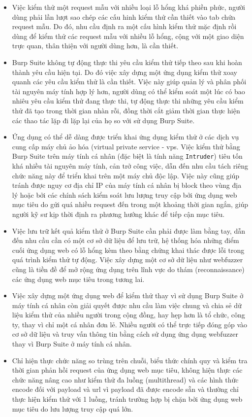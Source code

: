 \begin{itemize}
    \item Việc kiểm thử một request mẫu với nhiều loại lỗ hổng khá phiền phức, người dùng phải lần lượt sao chép các cấu hinh kiểm thử cần thiết vào tab chứa request mẫu. Do đó, nhu cầu định ra một cấu hình kiểm thử mặc định rồi dùng để kiểm thử các request mẫu với nhiều lỗ hổng, cộng với một giao diện trực quan, thân thiện với người dùng hơn, là cần thiết.
    \item Burp Suite không tự động thực thi yêu cầu kiểm thử tiếp theo sau khi hoàn thành yêu cầu hiện tại. Do đó việc xây dựng một ứng dụng kiểm thử xoay quanh các yêu cầu kiểm thử là cần thiết. Việc này giúp quản lý và phân phối tài nguyên máy tính hợp lý hơn, người dùng có thể kiểm soát một lúc có bao nhiêu yêu cầu kiểm thử đang thực thi, tự động thực thi những yêu cầu kiểm thử đã tạo trong thời gian nhàn rỗi, đồng thời cắt giảm thời gian thực hiện các thao tác lặp đi lặp lại của họ so với sử dụng Burp Suite.
    \item Ứng dụng có thể dễ dàng được triển khai ứng dụng kiểm thử ở các dịch vụ cung cấp máy chủ ảo hóa (virtual private service - \acrshort{vps}. Việc kiểm thử bằng Burp Suite trên máy tính cá nhân (đặc biệt là tính năng \texttt{Intruder}) tiêu tốn khá nhiều tài nguyên máy tính, cản trở công việc, dẫn đến nhu cầu tách riêng chức năng này để triển khai trên một máy chủ độc lập. Việc này cũng giúp tránh được nguy cơ địa chỉ IP của máy tính cá nhân bị block theo vùng địa lý hoặc bởi các chính sách kiểm soát lưu lượng truy cập bởi ứng dụng web mục tiêu do gửi quá nhiều request đến trong một khoảng thời gian ngắn, giúp người kỹ sư kịp thời định ra phương hướng khác để tiếp cận mục tiêu.
    \item Việc lưu trữ kết quả kiểm thử ở Burp Suite cần phải được làm bằng tay, dẫn đến nhu cầu cần có một cơ sở dữ liệu để lưu trữ, hệ thống hóa những điểm cuối ứng dụng web có lỗ hổng kèm theo bằng chứng khai thác được lỗi trong quá trình kiểm thử tự động. Việc xây dựng một cơ sở dữ liệu như webfuzzer cũng là tiền đề để mở rộng ứng dụng trên lĩnh vực do thám (reconnaissance) các ứng dụng web mục tiêu trong tương lai.
    \item Việc xây dựng một ứng dụng web để kiểm thử thay vì sử dụng Burp Suite ở máy tính cá nhân còn giải quyết được nhu cầu làm việc chung và chia sẻ dữ liệu kiểm thử của nhiều người trong cộng đồng, hay hẹp hơn là tổ chức, công ty, thay vì chỉ một cá nhân đơn lẻ. Nhiều người có thể trực tiếp đóng góp vào cơ sở dữ liệu và truy vấn thông tin bằng cách sử dụng ứng dụng webfuzzer thay vì Burp Suite ở máy tính cá nhân.
    \item Chỉ hiện thực chức năng so trùng trên chuỗi, biểu thức chính quy và kiểm tra thời gian phản hồi request của ứng dụng web mục tiêu, không hiện thực các chức năng nâng cao như kiểm thử đa luồng (multithread) và các hình thức encode đối với payload và \acrshort{url} vì payload đã được encode sẵn và thường chỉ thực hiện kiểm thử với 1 luồng, tránh trường hợp bị chặn bởi ứng dụng web mục tiêu do lưu lượng truy cập quá lớn.
\end{itemize}